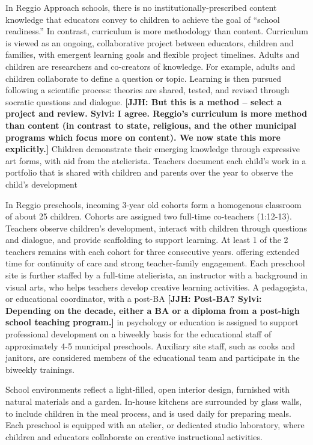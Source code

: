 In Reggio Approach schools, there is no institutionally-prescribed content knowledge that educators convey to children to achieve the goal of ``school readiness.'' In contrast, curriculum is more methodology than content. Curriculum is viewed as an ongoing, collaborative project between educators, children and families, with emergent learning goals and flexible project timelines. Adults and children are researchers and co-creators of knowledge. For example, adults and children collaborate to define a question or topic. Learning is then pursued following a scientific process: theories are shared, tested, and revised through socratic questions and dialogue. \textbf{[JJH: But this is a method -- select a project and review. Sylvi: I agree. Reggio's curriculum is more method than content (in contrast to state, religious, and the other municipal programs which focus more on content). We now state this more explicitly.]} Children demonstrate their emerging knowledge through expressive art forms, with aid from the atelierista. Teachers document each child's work in a portfolio that is shared with children and parents over the year to observe the child's development \citep{Rinaldi_2006_ReggioEmilia_BOOK,Giudici-Nicolosi_2014_Reggio-Approach}

In Reggio preschools, incoming 3-year old cohorts form a homogenous classroom of about 25 children. Cohorts are assigned two full-time co-teachers (1:12-13). Teachers observe children's development, interact with children through questions and dialogue, and provide scaffolding to support learning. At least 1 of the 2 teachers remains with each cohort for three consecutive years. offering extended time for continuity of care and strong teacher-family engagement. Each preschool site is further staffed by a full-time atelierista, an instructor with a background in visual arts, who helps teachers develop creative learning activities. A pedagogista, or educational coordinator, with a post-BA \textbf{[JJH: Post-BA? Sylvi: Depending on the decade, either a BA or a diploma from a post-high school teaching program.]} in psychology or education is assigned to support professional development on a biweekly basis for the educational staff of approximately 4-5 municipal preschools. Auxiliary site staff, such as cooks and janitors, are considered members of the educational team and participate in the biweekly trainings.

School environments reflect a light-filled, open interior design, furnished with natural materials and a garden. In-house kitchens are surrounded by glass walls, to include children in the meal process, and is used daily for preparing meals. Each preschool is equipped with an atelier, or dedicated studio laboratory, where children and educators collaborate on creative instructional activities.

